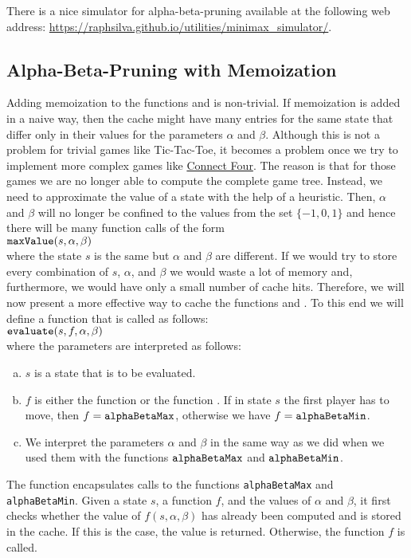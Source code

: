 \remark
There is a nice simulator for alpha-beta-pruning available at the following web address:
\href{https://raphsilva.github.io/utilities/minimax_simulator/}{https://raphsilva.github.io/utilities/minimax\_simulator/}.

\subsection{Alpha-Beta-Pruning with Memoization}
Adding memoization to the functions  and  is non-trivial.
If memoization is added in a naive way, then the cache might have many entries for the same state that differ
only in their values for the parameters $\alpha$ and $\beta$.  Although this is not a problem for trivial games
like Tic-Tac-Toe, it becomes a problem once we try to implement more complex games like
\href{https://en.wikipedia.org/wiki/Connect_Four}{Connect Four}. The reason is that for those games we are no
longer able to compute the complete game tree.  Instead, we need to approximate the value of a state with the
help of a heuristic.  Then, $\alpha$ and $\beta$ will no longer be confined to the values from the set
$\{-1,0,1\}$ and hence there will be many function calls of the form
\\[0.2cm]
\hspace*{1.3cm}
$\texttt{maxValue}(s, \alpha, \beta)$ 
\\[0.2cm]
where the state $s$ is the same but $\alpha$ and $\beta$ are different.  If we would try to store every
combination of $s$, $\alpha$, and $\beta$ we would waste a lot of memory and, furthermore, we would have only a
small number of cache hits.  Therefore, we will now present a more effective way to cache the functions
 and .  To this end we will define a function  that is
called as follows:
\\[0.2cm]
\hspace*{1.3cm}
$\texttt{evaluate}(s, f, \alpha, \beta)$
\\[0.2cm]
where the parameters are interpreted as follows:
\begin{enumerate}[(a)]
\item $s$ is a state that is to be evaluated.
\item $f$ is either the function  or the function .
      If in state $s$ the first player has to move, then $f = \texttt{alphaBetaMax}$, otherwise we have
      $f = \texttt{alphaBetaMin}$.
\item We interpret the parameters $\alpha$ and $\beta$ in the same way as we did when we used them with
      the functions $\texttt{alphaBetaMax}$ and $\texttt{alphaBetaMin}$.
\end{enumerate}
The function  encapsulates calls to the functions \texttt{alphaBetaMax} and
\texttt{alphaBetaMin}.  Given a state $s$, a function $f$, and the values of $\alpha$ and $\beta$, 
it first checks whether the value of $f(s, \alpha, \beta)$ has already been computed and is stored in the
cache.  If this is the case, the value is returned.  Otherwise, the function $f$ is called.  

